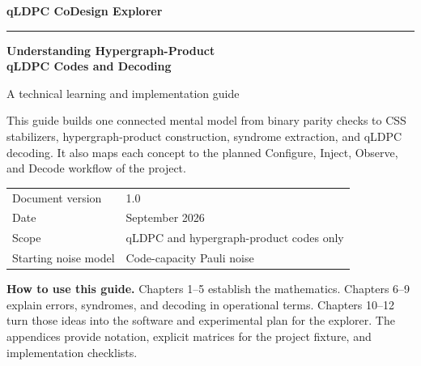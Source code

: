 \documentclass[11pt,letterpaper]{article}
\begin{document}
\begin{titlepage}
  \pagecolor{navy}
  \color{white}
  \vspace*{0.65in}
  {\Large\bfseries qLDPC CoDesign Explorer\par}
  \vspace{0.18in}
  {\color{white!65}\rule{\textwidth}{0.7pt}\par}
  \vspace{0.75in}
  {\fontsize{26}{32}\selectfont\bfseries Understanding Hypergraph-Product\\qLDPC Codes and Decoding\par}
  \vspace{0.3in}
  {\Large A technical learning and implementation guide\par}
  \vspace{0.55in}

  \begin{tcolorbox}[
    colback=navy!78!black,
    colframe=white!25,
    coltext=white!92,
    boxrule=0.6pt,
    arc=2mm,
    left=5mm,right=5mm,top=4mm,bottom=4mm
  ]
  \color{white!92}
  This guide builds one connected mental model from binary parity checks to CSS stabilizers,
  hypergraph-product construction, syndrome extraction, and qLDPC decoding. It also maps each
  concept to the planned Configure, Inject, Observe, and Decode workflow of the project.
  \end{tcolorbox}

  \vfill
  \begin{tabular}{@{}ll@{}}
    \color{white!60}Document version & \color{white}1.0 \\
    \color{white!60}Date & \color{white}September 2026 \\
    \color{white!60}Scope & \color{white}qLDPC and hypergraph-product codes only \\
    \color{white!60}Starting noise model & \color{white}Code-capacity Pauli noise \\
  \end{tabular}
  \vspace{0.3in}
\end{titlepage}
\nopagecolor

\begin{tcolorbox}[colback=paper,colframe=line,boxrule=0.6pt,arc=2mm]
\textbf{How to use this guide.} Chapters 1--5 establish the mathematics. Chapters 6--9 explain
errors, syndromes, and decoding in operational terms. Chapters 10--12 turn those ideas into the
software and experimental plan for the explorer. The appendices provide notation, explicit
matrices for the project fixture, and implementation checklists.
\end{tcolorbox}
\end{document}
